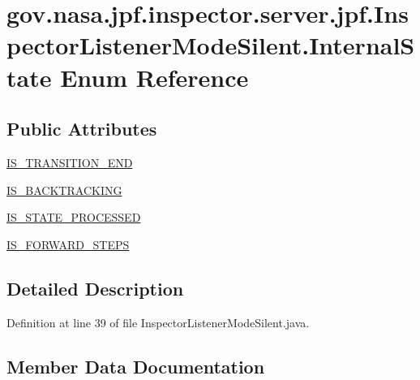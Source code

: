\hypertarget{enumgov_1_1nasa_1_1jpf_1_1inspector_1_1server_1_1jpf_1_1_inspector_listener_mode_silent_1_1_internal_state}{}\section{gov.\+nasa.\+jpf.\+inspector.\+server.\+jpf.\+Inspector\+Listener\+Mode\+Silent.\+Internal\+State Enum Reference}
\label{enumgov_1_1nasa_1_1jpf_1_1inspector_1_1server_1_1jpf_1_1_inspector_listener_mode_silent_1_1_internal_state}
\subsection*{Public Attributes}
\begin{DoxyCompactItemize}
\item 
\hyperlink{enumgov_1_1nasa_1_1jpf_1_1inspector_1_1server_1_1jpf_1_1_inspector_listener_mode_silent_1_1_internal_state_a90117a0f47367dbacbacfcaa4ee8f49b}{I\+S\+\_\+\+T\+R\+A\+N\+S\+I\+T\+I\+O\+N\+\_\+\+E\+ND}
\item 
\hyperlink{enumgov_1_1nasa_1_1jpf_1_1inspector_1_1server_1_1jpf_1_1_inspector_listener_mode_silent_1_1_internal_state_a12f219243c5cbae7a0c912676b99a845}{I\+S\+\_\+\+B\+A\+C\+K\+T\+R\+A\+C\+K\+I\+NG}
\item 
\hyperlink{enumgov_1_1nasa_1_1jpf_1_1inspector_1_1server_1_1jpf_1_1_inspector_listener_mode_silent_1_1_internal_state_a03d7763804ef0653ffd90b3973ffa83d}{I\+S\+\_\+\+S\+T\+A\+T\+E\+\_\+\+P\+R\+O\+C\+E\+S\+S\+ED}
\item 
\hyperlink{enumgov_1_1nasa_1_1jpf_1_1inspector_1_1server_1_1jpf_1_1_inspector_listener_mode_silent_1_1_internal_state_ac0106956c74f80aa826623b3f58690e8}{I\+S\+\_\+\+F\+O\+R\+W\+A\+R\+D\+\_\+\+S\+T\+E\+PS}
\end{DoxyCompactItemize}


\subsection{Detailed Description}


Definition at line 39 of file Inspector\+Listener\+Mode\+Silent.\+java.



\subsection{Member Data Documentation}

